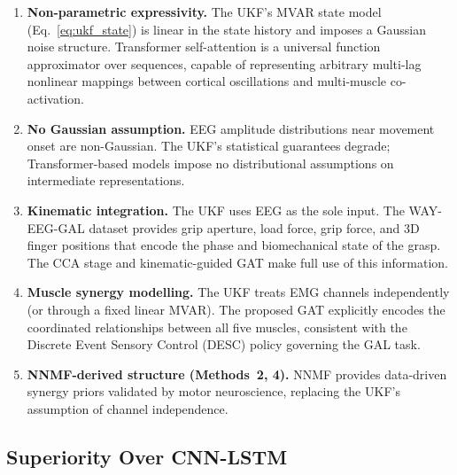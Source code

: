 \documentclass[12pt, a4paper]{article}
\begin{document}
	\begin{enumerate}[leftmargin=*, itemsep=4pt]
		\item \textbf{Non-parametric expressivity.} The UKF's MVAR state model
		(Eq.~\ref{eq:ukf_state}) is linear in the state history and imposes a
		Gaussian noise structure. Transformer self-attention is a universal
		function approximator over sequences, capable of representing arbitrary
		multi-lag nonlinear mappings between cortical oscillations and multi-muscle
		co-activation.
		
		\item \textbf{No Gaussian assumption.} EEG amplitude distributions near
		movement onset are non-Gaussian. The UKF's statistical guarantees
		degrade; Transformer-based models impose no distributional assumptions on
		intermediate representations.
		
		\item \textbf{Kinematic integration.} The UKF uses EEG as the sole input.
		The WAY-EEG-GAL dataset provides grip aperture, load force, grip force,
		and 3D finger positions that encode the phase and biomechanical state of
		the grasp. The CCA stage and kinematic-guided GAT make full use of this
		information.
		
		\item \textbf{Muscle synergy modelling.} The UKF treats EMG channels
		independently (or through a fixed linear MVAR). The proposed GAT
		explicitly encodes the coordinated relationships between all five muscles,
		consistent with the Discrete Event Sensory Control (DESC) policy
		governing the GAL task.
		
		\item \textbf{NNMF-derived structure (Methods~2, 4).} NNMF provides
		data-driven synergy priors validated by motor neuroscience, replacing
		the UKF's assumption of channel independence.
	\end{enumerate}
	
	\subsection{Superiority Over CNN-LSTM}
	
\end{document}
